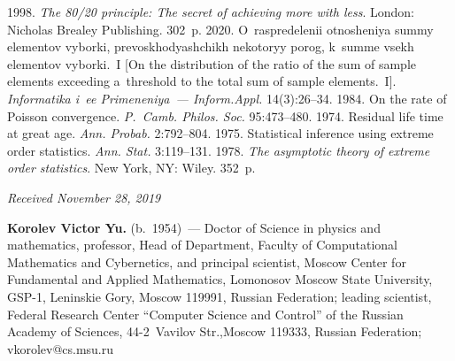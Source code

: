   \begin{multicols}{2}

\renewcommand{\bibname}{\protect\rmfamily References}

{\small\frenchspacing
 {%
 \begin{thebibliography}{9}

 1998. \textit{The 80/20 principle: The secret of achieving more with less}. London: 
Nicholas Brealey Publishing. 302~p.
 2020. O~raspredelenii otnosheniya summy elementov vyborki, 
prevoskhodyashchikh nekotoryy porog, k~summe vsekh elementov vyborki.~I [On the distribution of the 
ratio of the sum of sample elements exceeding a~threshold to the total sum of sample elements.~I]. 
\textit{Informatika i~ee Primeneniya~--- Inform.Appl.} 14(3):26--34.
 1984. On the rate of Poisson convergence. \textit{P.~Camb. Philos. Soc.} 95:473--480.
 1974. Residual life time at great age. \textit{Ann. Probab.} 
2:792--804.
 1975. Statistical inference using extreme order statistics. \textit{Ann.  Stat.} 
3:119--131.
 1978. \textit{The asymptotic theory of extreme order statistics}. New York, NY: 
Wiley. 352~p.
\end{thebibliography}

 }
 }

\end{multicols}

\vspace*{-3pt}

\hfill{\small\textit{Received November 28, 2019}}




\Contrl

\noindent
\textbf{Korolev Victor Yu.} (b.\ 1954)~--- Doctor of Science in physics and mathematics, professor, 
Head of Department, Faculty of Computational Mathematics and Cybernetics, and principal scientist, 
Moscow Center for Fundamental and Applied Mathematics, Lomonosov Moscow State University, 
GSP-1, Leninskie Gory, Moscow 119991, Russian Federation; leading scientist, Federal Research Center 
``Computer Science and Control'' of the Russian Academy of Sciences, 44-2~Vavilov Str.,Moscow 
119333, Russian Federation; \mbox{vkorolev@cs.msu.ru}

\label{end\stat}

\renewcommand{\bibname}{\protect\rm Литература} 